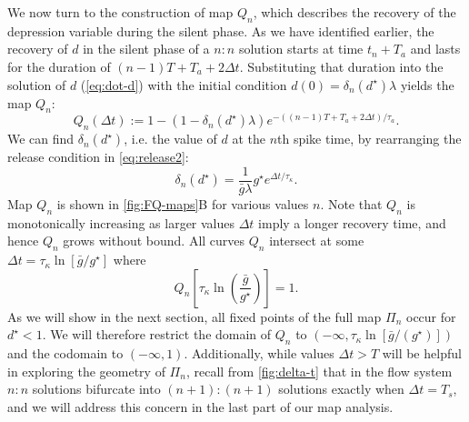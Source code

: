 \documentclass[utf8]{frontiersFPHY} %
\newcommand{\dn}{\delta_n}
\begin{document}
We now turn to the construction of map $Q_n$, which describes the recovery of the depression variable during the silent phase.
As we have identified earlier, the recovery of $d$ in the silent phase of a $n:n$ solution starts at time $t_{n} + T_{a}$ and lasts for the duration of $(n-1)T + T_{a} + 2\Delta t$.
Substituting that duration into the solution of $d$ (\cref{eq:dot-d}) with the initial condition $d(0)=\dn(d^\star) \lambda$ yields the map $Q_{n}$:
\begin{equation}
	\label{eq:Qn-map}
	Q_n(\Delta t) := 1- (1- \dn(d^\star) \lambda)e^{-((n-1)T + T_{a} + 2\Delta t)/\tau_a}.
\end{equation}
\noindent
We can find $\delta_{n}(d^{\star})$, i.e. the value of $d$ at the $n$th spike time, by rearranging the release condition in \cref{eq:release2}:
\begin{equation}
	\label{eq:dn}
	\delta_{n}(d^{\star}) = \frac{1}{\bar g \lambda} g^\star e^{\Delta t/\tau_\kappa}.
\end{equation}
Map $Q_n$ is shown in \cref{fig:FQ-maps}B for various values $n$.
Note that $Q_n$ is monotonically increasing as larger values $\Delta t$ imply a longer recovery time, and hence $Q_{n}$ grows without bound.
All curves $Q_{n}$ intersect at some $\Delta t = \tau_\kappa\ln{\left[\bar g/g^\star\right]}$ where
\begin{equation}
	\label{eq:Qn-intersect}
	Q_n\left[\tau_\kappa\ln{\left(\frac{\bar g}{g^\star}\right)}\right]=1.
\end{equation}
As we will show in the next section, all fixed points of the full map $\Pi_n$ occur for $d^\star<1$.
We will therefore restrict the domain of $Q_n$ to $(-\infty, \tau_\kappa\ln{\left[\bar g/(g^\star)\right]})$ and the codomain to $(-\infty, 1)$.
Additionally, while values $\Delta t>T$ will be helpful in exploring the geometry of $\Pi_{n}$, recall from \cref{fig:delta-t} that in the flow system $n:n$ solutions bifurcate into $(n+1):(n+1)$ solutions exactly when $\Delta t = T_{s}$, and we will address this concern in the last part of our map analysis.
\end{document}
